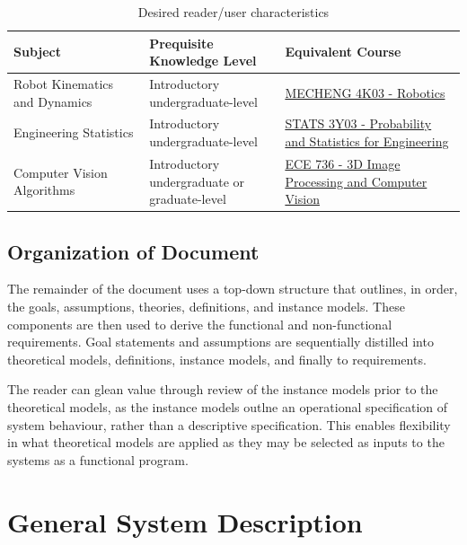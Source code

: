 \documentclass[12pt]{article}
\begin{document}
\begin{table}[h!]
  \begin{tabular}{|p{0.3\linewidth}|p{0.3\linewidth}|p{0.4\linewidth}|}
  \hline 
  Subject                       & Prequisite Knowledge Level                   & Equivalent Course                                                                                                                                                            \\ \hline
  Robot Kinematics and Dynamics & Introductory undergraduate-level             & \href{https://academiccalendars.romcmaster.ca/preview\_course\_nopop.php?catoid=53\&coid=265836}{MECHENG 4K03 - Robotics}                                 \\ \hline
  Engineering Statistics        & Introductory undergraduate-level             & \href{https://academiccalendars.romcmaster.ca/preview\_course\_nopop.php?catoid=53\&coid=265836}{STATS 3Y03 - Probability and Statistics for Engineering} \\ \hline
  Computer Vision Algorithms    & Introductory undergraduate or graduate-level & \href{https://academiccalendars.romcmaster.ca/preview\_course\_nopop.php?catoid=53\&coid=265836}{ECE 736 - 3D Image Processing and Computer Vision}       \\ \hline
  \end{tabular}
  \caption{Desired reader/user characteristics}
  \label{Table_UserChar}
  \end{table}

\subsection{Organization of Document}
The remainder of the document uses a top-down structure that outlines, in order, 
the goals, assumptions, theories, definitions, and instance models. These 
components are then used to derive the functional and non-functional requirements. 
Goal statements and assumptions are sequentially distilled into theoretical models, 
definitions, instance models, and finally to requirements.

The reader can glean value through review of the instance models prior to 
the theoretical models, as the instance models outlne an operational specification of 
system behaviour, rather than a descriptive specification. This enables flexibility 
in what theoretical models are applied as they may be selected as inputs to the 
systems as a functional program. 

\section{General System Description}
\end{document}
